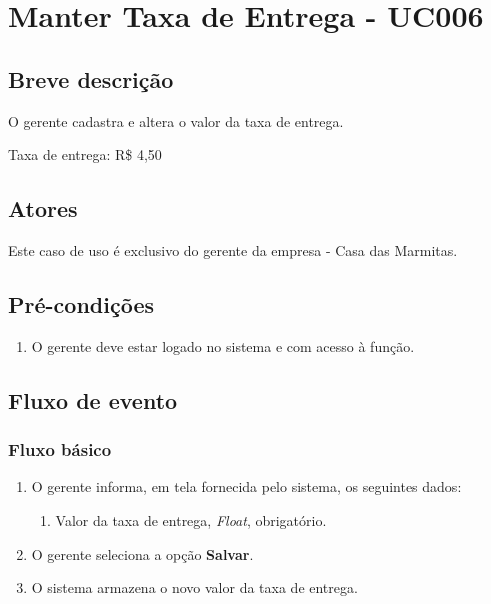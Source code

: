 \chapter{Manter Taxa de Entrega - UC006} \label{uc006}

\section{Breve descrição}

O gerente cadastra e altera o valor da taxa de entrega.

Taxa de entrega: R\$ 4,50

\section{Atores}

Este caso de uso é exclusivo do gerente da empresa - Casa das Marmitas.

\section{Pré-condições}

\begin{enumerate}
	\item O gerente deve estar logado no sistema e com acesso à função.
\end{enumerate}

\section{Fluxo de evento}

\subsection{Fluxo básico}

\begin{enumerate}
	\item O gerente informa, em tela fornecida pelo sistema, os seguintes dados:
	\begin{enumerate}
		\item Valor da taxa de entrega, \emph{Float}, obrigatório.
	\end{enumerate}
	\item O gerente seleciona a opção \textbf{Salvar}.
	\item O sistema armazena o novo valor da taxa de entrega.
\end{enumerate}

